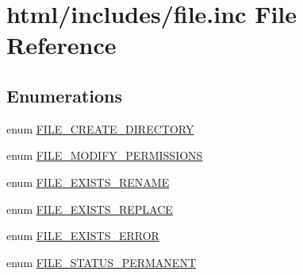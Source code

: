 \hypertarget{file_8inc}{
\section{html/includes/file.inc File Reference}
\label{file_8inc}
}
\subsection*{Enumerations}
\begin{DoxyCompactItemize}
\item 
enum \hyperlink{group__file_ga851cbf30c0a6d31a1733590cf80c39e5}{FILE\_\-CREATE\_\-DIRECTORY} 
\item 
enum \hyperlink{group__file_ga30d56f1f9c1a4d832c411ef51d9b276d}{FILE\_\-MODIFY\_\-PERMISSIONS} 
\item 
enum \hyperlink{group__file_ga5d6636d4ccd022885823b91f17a0f464}{FILE\_\-EXISTS\_\-RENAME} 
\item 
enum \hyperlink{group__file_ga54c3c90d9cb7857114326cb5114e7159}{FILE\_\-EXISTS\_\-REPLACE} 
\item 
enum \hyperlink{group__file_ga99e741faa66e03cdb8738b717be227fd}{FILE\_\-EXISTS\_\-ERROR} 
\item 
enum \hyperlink{group__file_gaf208a7c7d7fd09276233583b22e4ee32}{FILE\_\-STATUS\_\-PERMANENT} 
\end{DoxyCompactItemize}
